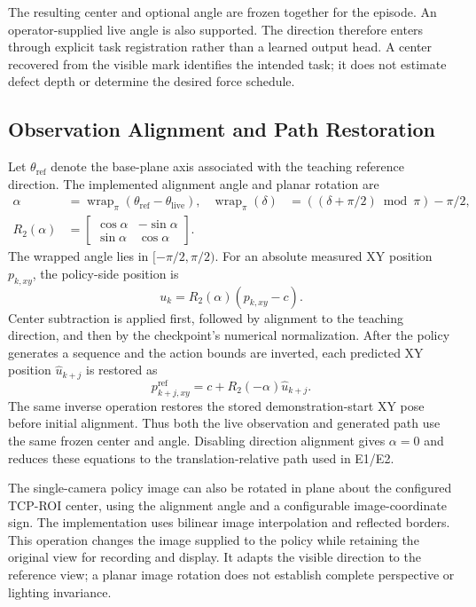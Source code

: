The resulting center and optional angle are frozen together for the episode. An operator-supplied live angle is also supported. The direction therefore enters through explicit task registration rather than a learned output head. A center recovered from the visible mark identifies the intended task; it does not estimate defect depth or determine the desired force schedule.

\subsection{Observation Alignment and Path Restoration}
Let \(\theta_{\mathrm{ref}}\) denote the base-plane axis associated with the teaching reference direction. The implemented alignment angle and planar rotation are
\begin{align}
 \alpha&=\operatorname{wrap}_{\pi}
       (\theta_{\mathrm{ref}}-\theta_{\mathrm{live}}),
 &\operatorname{wrap}_{\pi}(\delta)
   &=((\delta+\pi/2)\bmod\pi)-\pi/2,\label{eq:stain_axis_alignment}\\
 R_2(\alpha)&=\begin{bmatrix}
  \cos\alpha&-\sin\alpha\\\sin\alpha&\cos\alpha
 \end{bmatrix}.&&\nonumber
\end{align}
The wrapped angle lies in \([-\pi/2,\pi/2)\). For an absolute measured XY position \(p_{k,xy}\), the policy-side position is
\begin{equation}
 u_k=R_2(\alpha)(p_{k,xy}-c).
 \label{eq:stain_canonical_observation}
\end{equation}
Center subtraction is applied first, followed by alignment to the teaching direction, and then by the checkpoint's numerical normalization. After the policy generates a sequence and the action bounds are inverted, each predicted XY position \(\widehat u_{k+j}\) is restored as
\begin{equation}
 p_{k+j,xy}^{\mathrm{ref}}
   =c+R_2(-\alpha)\widehat u_{k+j}.
 \label{eq:stain_canonical_action}
\end{equation}
The same inverse operation restores the stored demonstration-start XY pose before initial alignment. Thus both the live observation and generated path use the same frozen center and angle. Disabling direction alignment gives \(\alpha=0\) and reduces these equations to the translation-relative path used in E1/E2.

The single-camera policy image can also be rotated in plane about the configured TCP-ROI center, using the alignment angle and a configurable image-coordinate sign. The implementation uses bilinear image interpolation and reflected borders. This operation changes the image supplied to the policy while retaining the original view for recording and display. It adapts the visible direction to the reference view; a planar image rotation does not establish complete perspective or lighting invariance.

